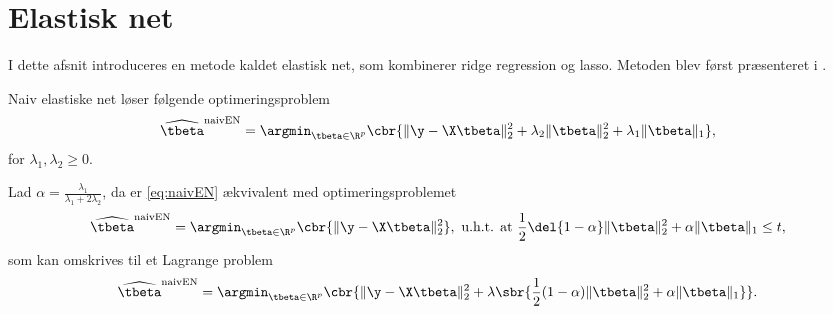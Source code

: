\section{Elastisk net}
I dette afsnit introduceres en metode kaldet elastisk net, som kombinerer ridge regression og lasso.
Metoden blev først præsenteret i \citep{zou_hastie}.
%
%
%
\begin{defn}
Naiv elastiske net løser følgende optimeringsproblem
\begin{align}
\widehat{\tbeta}^\text{naivEN} = \argmin_{\tbeta \in \R^p} \cbr{\Vert \y - \X \tbeta \Vert_2^2 + \lambda_2 \Vert \tbeta \Vert_2^2 + \lambda_1 \Vert \tbeta \Vert_1}, \label{eq:naivEN}
\end{align}
for \(\lambda_1, \lambda_2 \geq 0\).
\end{defn}
%
Lad \(\alpha = \frac{\lambda_1}{\lambda_1 + 2\lambda_2}\), da er \eqref{eq:naivEN} ækvivalent med optimeringsproblemet
\begin{align*}
\widehat{\tbeta}^\text{naivEN} = \argmin_{\tbeta \in \R^p} \cbr{\Vert \y - \X \tbeta \Vert_2^2}, \ \text{u.h.t. at } \frac{1}{2}\del{1-\alpha} \Vert \tbeta \Vert_2^2 + \alpha \Vert \tbeta \Vert_1 \leq t,
\end{align*}
som kan omskrives til et Lagrange problem
\begin{align}
\widehat{\tbeta}^\text{naivEN} =\argmin_{\tbeta \in \R^p} \cbr{ \Vert \y - \X \tbeta \Vert_2^2 + \lambda \sbr{\frac{1}{2}(1- \alpha) \Vert \tbeta \Vert_2^2 + \alpha \Vert \tbeta \Vert_1}}. \label{eq:4.2}
\end{align}

